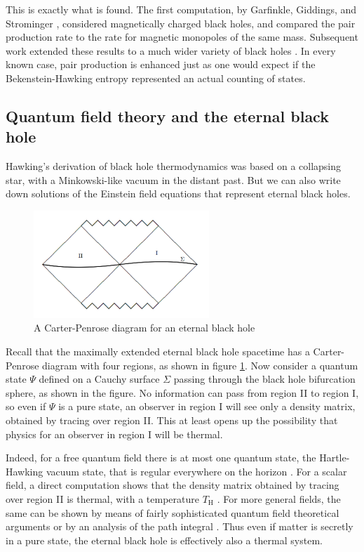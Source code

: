 \documentclass[11pt]{article}
\begin{document}
This is exactly what is found.  The first computation, by Garfinkle,
Giddings, and Strominger \cite{Garfinkle}, considered magnetically
charged black holes, and compared the pair production rate to the
rate for magnetic monopoles of the same mass.  Subsequent
work extended these results to a much wider variety of black holes
\cite{Brown,Dowker,MannRoss}.  In every known case, pair production
is enhanced just as one would expect if the Bekenstein-Hawking entropy
represented an actual counting of states.

\subsection{Quantum field theory and the eternal black hole \label{eterna}}

Hawking's derivation of black hole thermodynamics was based on a 
collapsing star, with a Minkowski-like vacuum
in the distant past.  But we can also write down solutions of the Einstein
field equations that represent eternal black holes.   
\begin{figure}
\centerline{\includegraphics[width=2.6in]{eternal.pdf}}
\caption{A Carter-Penrose diagram for an eternal black hole}
\label{Carlipfig3}
\end{figure}

Recall that the
maximally extended eternal black hole spacetime has a Carter-Penrose 
diagram with four regions, as shown in figure \ref{Carlipfig3}.
Now consider a quantum state $\Psi$ defined on a Cauchy surface 
$\Sigma$ passing through the black hole bifurcation sphere, as shown 
in the figure.  No information can pass from region II to region I, so even 
if $\Psi$ is a pure state, an observer in region I will see only a density 
matrix, obtained by tracing over region II.  This at least opens up the
possibility that physics for an observer in region I will be thermal.

Indeed, for a free quantum field there is at most one quantum state, 
the Hartle-Hawking vacuum state, that is regular everywhere on the 
horizon \cite{Waldbk,Kay}.   For a scalar field, a direct computation 
shows that the density matrix obtained by tracing over region II 
is thermal, with a temperature $T_{\scriptscriptstyle\mathrm{H}}$ 
\cite{Israelb}.  For more general fields, the same can be shown by 
means of fairly sophisticated quantum field theoretical arguments
\cite{Waldbk,Kay} or by an analysis of the path integral \cite{Jacobsond}.
Thus even if matter is secretly in a pure state, the eternal black hole is 
effectively also a thermal system.
\end{document}
